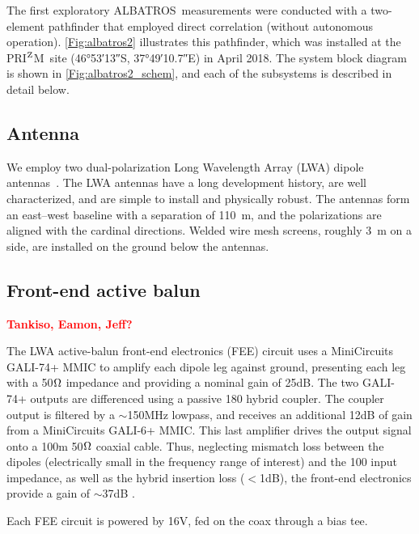 \documentclass{ws-jai}
\def\albatros{ALBATROS}
\def\prizm{PRI$^{\rm Z}$M}
\newcommand{\attention}[1]{\textcolor{red}{\bf {#1}}}
\begin{document}
The first exploratory \albatros\ measurements were conducted with a
two-element pathfinder that employed direct correlation (without
autonomous operation).  \autoref{Fig:albatros2} illustrates this
pathfinder, which was installed at the \prizm\ site (\ang{46;53;13}S,
\ang{37;49;10.7}E) in April 2018.  The system block diagram is shown
in \autoref{Fig:albatros2_schem}, and each of the subsystems is
described in detail below.

\subsection{Antenna}	
We employ two dual-polarization Long Wavelength Array (LWA) dipole
antennas~\citep{Memo28}.  The LWA antennas have a long development
history, are well characterized, and are simple to install and
physically robust.  The antennas form an east--west baseline with a
separation of \SI{110}{m}, and the polarizations are aligned with the
cardinal directions.  Welded wire mesh screens, roughly 3~m on a side,
are installed on the ground below the antennas.

\subsection{Front-end active balun}
\attention{Tankiso, Eamon, Jeff?} \\
\label{section:FEE}

The LWA active-balun front-end electronics (FEE) circuit uses a MiniCircuits GALI-74+ MMIC 
to amplify each dipole leg against ground, presenting each leg with a 50$\ohm$ impedance 
and providing a nominal gain of 25dB. The two GALI-74+ outputs are differenced using a 
passive {180\degree} hybrid coupler. The coupler output is filtered by a $\sim$150MHz lowpass, 
and receives an additional 12dB of gain from a MiniCircuits GALI-6+ MMIC. This last amplifier 
drives the output signal onto a 100m 50$\ohm$ coaxial cable. Thus, neglecting mismatch loss 
between the dipoles (electrically small in the frequency range of interest) and the 100{\ohm} 
input impedance, as well as the hybrid insertion loss ($<$1dB), the front-end electronics 
provide a gain of $\sim$37dB \cite{2012PASP..124.1090H}. 

Each FEE circuit is powered by 16V, fed on the coax through a bias tee.

\end{document}
